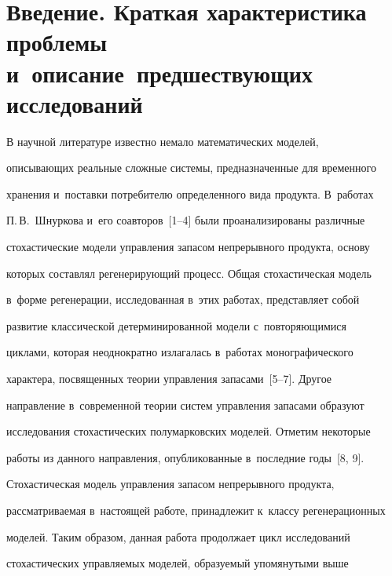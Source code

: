 


 \thispagestyle{headings}

 


  

\section{Введение. Краткая характеристика проблемы и~описание~предшествующих исследований}



  В научной литературе известно немало математических моделей, 

описывающих реальные сложные системы, предназначенные для временного 

хранения и~поставки потребителю определенного вида продукта. В~работах 

П.\,В.~Шнуркова и~его соавторов~[1--4] были проанализированы различные 

стохастические модели управления запасом непрерывного продукта, основу 

которых составлял регенерирующий процесс. Общая стохастическая модель 

в~форме регенерации, исследованная в~этих работах, представляет собой 

развитие классической детерминированной модели с~повторяющимися 

циклами, которая неоднократно излагалась в~работах монографического 

характера, посвященных теории управления запасами~[5--7]. Другое 

направление в~современной теории систем управления запасами образуют 

исследования стохастических полумарковских моделей. Отметим некоторые 

работы из данного направления, опубликованные в~последние годы~[8, 9].

  

  Стохастическая модель управления запасом непрерывного продукта, 

рас\-смат\-ри\-ва\-емая в~настоящей работе, принадлежит к~классу регенерационных 

моделей. Таким образом, данная работа продолжает цикл исследований 

стохастических управляемых моделей, образуемый упомянутыми выше 

